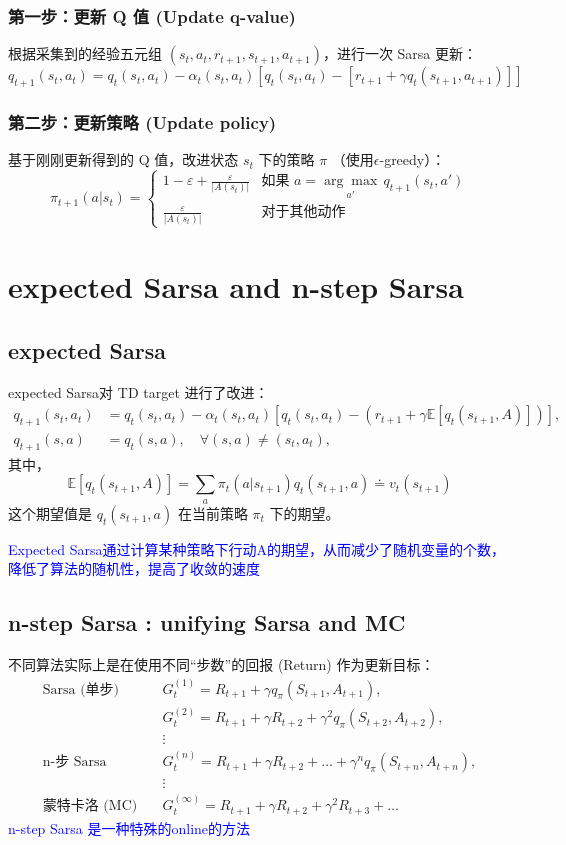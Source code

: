 \documentclass{article}
\begin{document}
\subsubsection*{第一步：更新 Q 值 (Update q-value)}
根据采集到的经验五元组 $(s_t, a_t, r_{t+1}, s_{t+1}, a_{t+1})$，进行一次 Sarsa 更新：
\[
q_{t+1}(s_t, a_t) = q_t(s_t, a_t) - \alpha_t(s_t, a_t) \left[ q_t(s_t, a_t) - [r_{t+1} + \gamma q_t(s_{t+1}, a_{t+1})] \right]
\]

\subsubsection*{第二步：更新策略 (Update policy)}
基于刚刚更新得到的 Q 值，改进状态 $s_t$ 下的策略 $\pi$ （使用$\epsilon$-greedy）：
\[
\pi_{t+1}(a|s_t) =
\begin{cases}
    1 - \varepsilon + \frac{\varepsilon}{|A(s_t)|} & \text{如果 } a = \underset{a'}{\arg\max} \, q_{t+1}(s_t, a') \\
    \frac{\varepsilon}{|A(s_t)|} & \text{对于其他动作}
\end{cases}
\]
\section{expected Sarsa and n-step Sarsa}
\subsection{expected Sarsa}
expected Sarsa对 TD target 进行了改进：
\begin{align*}
    q_{t+1}(s_t, a_t) &= q_t(s_t, a_t) - \alpha_t(s_t, a_t) \left[ q_t(s_t, a_t) - (r_{t+1} + \gamma \mathbb{E}[q_t(s_{t+1}, A)]) \right], \\
    q_{t+1}(s, a) &= q_t(s, a), \quad \forall (s, a) \neq (s_t, a_t),
\end{align*}
其中，
\[
\mathbb{E}[q_t(s_{t+1}, A)] = \sum_{a} \pi_t(a|s_{t+1}) q_t(s_{t+1}, a) \doteq v_t(s_{t+1})
\]
这个期望值是 $q_t(s_{t+1}, a)$ 在当前策略 $\pi_t$ 下的期望。

\textcolor{blue}{\kaishu*Expected Sarsa通过计算某种策略下行动A的期望，从而减少了随机变量的个数，降低了算法的随机性，提高了收敛的速度}
\subsection{n-step Sarsa : unifying Sarsa and MC}
不同算法实际上是在使用不同“步数”的回报 (Return) 作为更新目标：
\begin{align*}
    \text{Sarsa (单步)} \quad & G_t^{(1)} = R_{t+1} + \gamma q_{\pi}(S_{t+1}, A_{t+1}), \\
    \quad & G_t^{(2)} = R_{t+1} + \gamma R_{t+2} + \gamma^2 q_{\pi}(S_{t+2}, A_{t+2}), \\
    &\vdots \\
    \text{n-步 Sarsa} \quad & G_t^{(n)} = R_{t+1} + \gamma R_{t+2} + \dots + \gamma^n q_{\pi}(S_{t+n}, A_{t+n}), \\
    &\vdots \\
    \text{蒙特卡洛 (MC)} \quad & G_t^{(\infty)} = R_{t+1} + \gamma R_{t+2} + \gamma^2 R_{t+3} + \dots
\end{align*}
\textcolor{blue}{\kaishu*n-step Sarsa 是一种特殊的online的方法}
\end{document}
